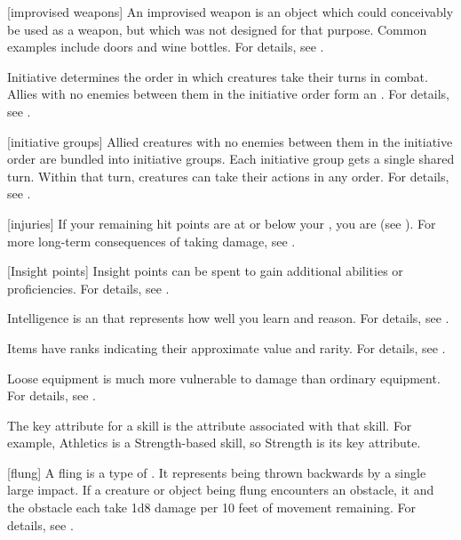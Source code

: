 [improvised weapons] An improvised weapon is an object which could conceivably be used as a weapon, but which was not designed for that purpose.
Common examples include doors and wine bottles.
For details, see .

 Initiative determines the order in which creatures take their turns in combat.
Allies with no enemies between them in the initiative order form an .
For details, see .

[initiative groups] Allied creatures with no enemies between them in the initiative order are bundled into initiative groups.
Each initiative group gets a single shared turn.
Within that turn, creatures can take their actions in any order.
For details, see .

[injuries] If your remaining hit points are at or below your , you are  (see ).
For more long-term consequences of taking damage, see .

[Insight points] Insight points can be spent to gain additional abilities or proficiencies.
For details, see .

 Intelligence is an  that represents how well you learn and reason.
For details, see .

 Items have ranks indicating their approximate value and rarity.
For details, see .

 Loose equipment is much more vulnerable to damage than ordinary equipment.
For details, see .

 The key attribute for a skill is the attribute associated with that skill.
For example, Athletics is a Strength-based skill, so Strength is its key attribute.

[flung] A fling is a type of .
It represents being thrown backwards by a single large impact.
If a creature or object being flung encounters an obstacle, it and the obstacle each take 1d8 damage per 10 feet of movement remaining.
For details, see .

